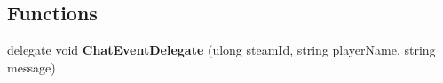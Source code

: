\subsection*{Functions}
\begin{DoxyCompactItemize}
\item 
\hypertarget{namespace_s_e_mod_a_p_i_extensions_1_1_a_p_i_a6fb1a474e8147e42d4397811925cf6a8}{}delegate void {\bfseries Chat\+Event\+Delegate} (ulong steam\+Id, string player\+Name, string message)\label{namespace_s_e_mod_a_p_i_extensions_1_1_a_p_i_a6fb1a474e8147e42d4397811925cf6a8}

\end{DoxyCompactItemize}
